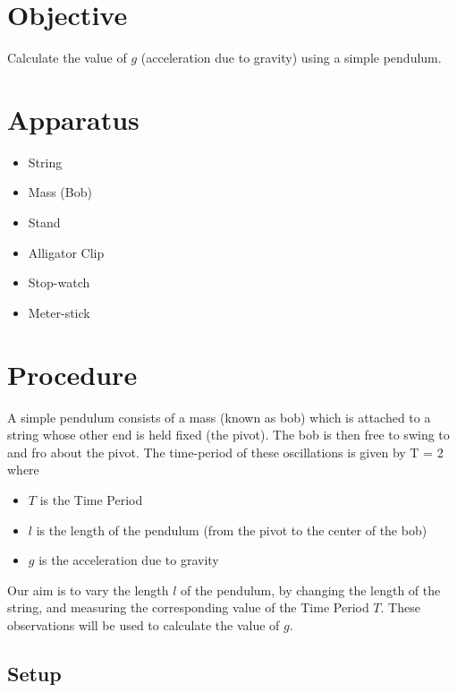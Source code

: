 \section*{Objective}

    Calculate the value of $g$ (acceleration due to gravity) using a simple pendulum.

\section*{Apparatus}

    \begin{itemize}

        \item String
        \item Mass (Bob)
        \item Stand
        \item Alligator Clip
        \item Stop-watch
        \item Meter-stick

    \end{itemize}

\section*{Procedure}

    A simple pendulum consists of a mass (known as bob) which is attached to a string whose other end is held fixed (the pivot). The bob is then free to swing to and fro about the pivot. The time-period of these oscillations is given by
    \beq \label{main}
        T = 2 \pi {}
    \eeq
    where
    \begin{itemize}
        \item $T$ is the Time Period
        \item $l$ is the length of the pendulum (from the pivot to the center of the bob)
        \item $g$ is the acceleration due to gravity
    \end{itemize}

    Our aim is to vary the length $l$ of the pendulum, by changing the length of the string, and measuring the corresponding value of the Time Period $T$. These observations will be used to calculate the value of $g$.

\subsection*{Setup}

